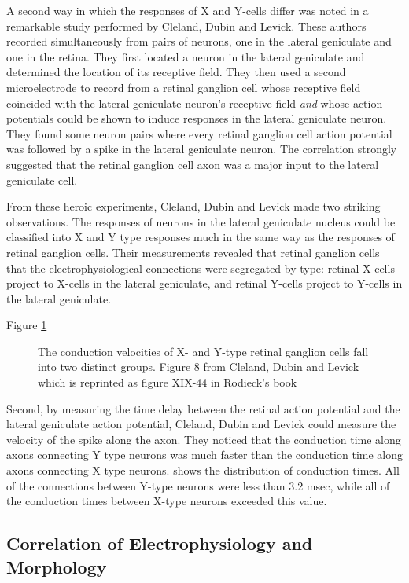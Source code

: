 A second way in which the responses of X and Y-cells differ
was noted in a remarkable study performed by
Cleland, Dubin and Levick.
These authors recorded simultaneously from pairs of
neurons, one in the lateral geniculate and one in the retina.
They first located a neuron in the lateral geniculate
and determined the location of its receptive field.
They then used a second microelectrode to record
from a retinal ganglion cell whose receptive field
coincided with the lateral geniculate neuron's receptive field
{\em and} whose action potentials could be shown to induce responses
in the lateral geniculate neuron.
They found some neuron pairs
where every retinal ganglion cell action potential
was followed by a spike in the lateral geniculate neuron.
The correlation strongly suggested that the retinal
ganglion cell axon was a major input to the lateral
geniculate cell.

From these heroic experiments, Cleland, Dubin and Levick
made two striking observations.
The responses of neurons
in the lateral geniculate nucleus could be classified
into X and Y type responses much in the same
way as the responses of retinal ganglion cells.
Their measurements revealed that retinal ganglion
cells that the electrophysiological connections
were segregated by type:  retinal X-cells project
to X-cells in the lateral geniculate, and retinal Y-cells
project to Y-cells in the lateral geniculate.

Figure \ref{f4:conduction.time}
\begin{figure}
\centerline {
}
\caption[Conduction Velocities of X and Y]{
The conduction velocities of X- and Y-type retinal ganglion
cells fall into two distinct groups.
Figure 8 from Cleland, Dubin and Levick which is reprinted as
figure XIX-44 in Rodieck's book
}
\label{f4:conduction.time}
\end{figure}
Second, by measuring the time delay between the retinal
action potential and the lateral geniculate action
potential, Cleland, Dubin and Levick could
measure the velocity of the spike along the axon.
They noticed that the conduction time along axons
connecting Y type neurons was much faster than
the conduction time along axons connecting X type neurons.
shows the distribution of conduction times.
All of the connections between Y-type neurons
were less than 3.2 msec, while all of the conduction
times between X-type neurons exceeded this value.

\subsection{Correlation of Electrophysiology and Morphology}

